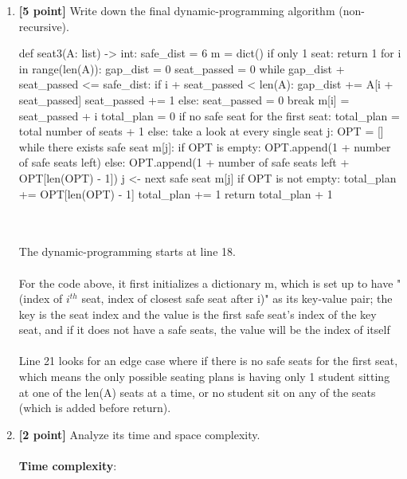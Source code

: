 \documentclass{assignment-373}
\begin{document}
\begin{enumerate}
\begin{enumerate}
  \item \textbf{[5 point]} Write down the final dynamic-programming
    algorithm (non-recursive).\\
     \begin{python}
def seat3(A: list) -> int:
    safe_dist = 6
    m = dict()
    if only 1 seat:
        return 1
    for i in range(len(A)):
        gap_dist = 0
        seat_passed = 0
        while gap_dist + seat_passed <= safe_dist:
            if i + seat_passed < len(A):
                gap_dist += A[i + seat_passed]
                seat_passed += 1
            else:
                seat_passed = 0
                break
        m[i] = seat_passed + i
    total_plan = 0
    if no safe seat for the first seat:
        total_plan = total number of seats + 1
    else:
        take a look at every single seat j:
            OPT = []
            while there exists safe seat m[j]:
                if OPT is empty:
                    OPT.append(1 + number of safe seats left)
                else:
                    OPT.append(1 + number of safe seats left + OPT[len(OPT) - 1])
                j <- next safe seat m[j]
            if OPT is not empty:
                total_plan += OPT[len(OPT) - 1]
            total_plan += 1
    return total_plan + 1
    \end{python}\\
    \\
    \phantom{=} \phantom{=} The dynamic-programming starts at line 18.\\
    \\
    \phantom{=} \phantom{=} For the code above, it first initializes a dictionary m, which is set up to have "(index of $i^{th}$ seat, index of closest safe seat after i)" as its key-value pair; the key is the seat index and the value is the first safe seat's index of the key seat, and if it does not have a safe seats, the value will be the index of itself\\
    \\
    \phantom{=} \phantom{=} Line 21 looks for an edge case where if there is no safe seats for the first seat, which means the only possible seating plans is having only 1 student sitting at one of the len(A) seats at a time, or no student sit on any of the seats (which is added before return).\\
  \item \textbf{[2 point]} Analyze its time and space complexity.\\\\
  {\bf Time complexity}: \\

\end{enumerate}
\end{enumerate}
\end{document}
